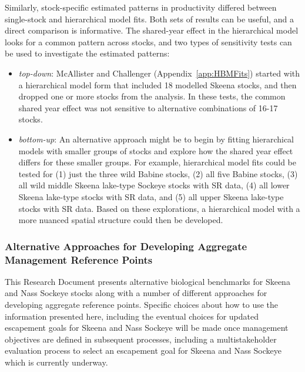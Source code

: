 \documentclass[french,11pt]{book}
\begin{document}
Similarly, stock-specific estimated patterns in productivity differed between single-stock and hierarchical model fits. Both sets of results can be useful, and a direct comparison is informative. The shared-year effect in the hierarchical model looks for a common pattern across stocks, and two types of sensitivity tests can be used to investigate the estimated patterns:
\begin{itemize}

\item
  \emph{top-down}: McAllister and Challenger (Appendix~\ref{app:HBMFits}) started with a hierarchical model form that included 18 modelled Skeena stocks, and then dropped one or more stocks from the analysis. In these tests, the common shared year effect was not sensitive to alternative combinations of 16-17 stocks.
\item
  \emph{bottom-up}: An alternative approach might be to begin by fitting hierarchical models with smaller groups of stocks and explore how the shared year effect differs for these smaller groups. For example, hierarchical model fits could be tested for (1) just the three wild Babine stocks, (2) all five Babine stocks, (3) all wild middle Skeena lake-type Sockeye stocks with SR data, (4) all lower Skeena lake-type stocks with SR data, and (5) all upper Skeena lake-type stocks with SR data. Based on these explorations, a hierarchical model with a more nuanced spatial structure could then be developed.
\end{itemize}
\subsubsection{Alternative Approaches for Developing Aggregate Management Reference Points}\label{AggregationComparison}

This Research Document presents alternative biological benchmarks for Skeena and Nass Sockeye stocks along with a number of different approaches for developing aggregate reference points. Specific choices about how to use the information presented here, including the eventual choices for updated escapement goals for Skeena and Nass Sockeye will be made once management objectives are defined in subsequent processes, including a multistakeholder evaluation process to select an escapement goal for Skeena and Nass Sockeye which is currently underway.
\end{document}
